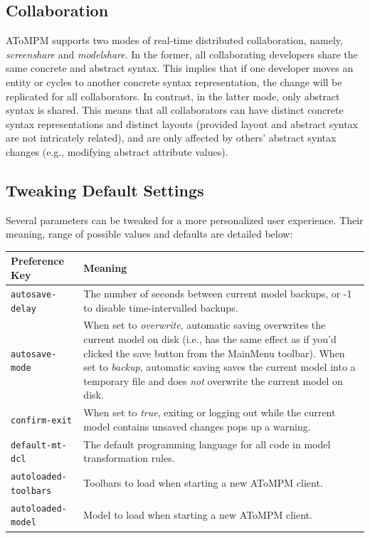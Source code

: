 \documentclass{article}
\numberwithin{equation}{section}
\numberwithin{figure}{section}
\begin{document}
\subsection{Collaboration}
AToMPM supports two modes of real-time distributed collaboration, namely, \textit{screenshare} and \textit{modelshare}. In the former, all collaborating developers share the same concrete and abstract syntax. This implies that if one developer moves an entity or cycles to another concrete syntax representation, the change will be replicated for all collaborators. In contrast, in the latter mode, only abstract syntax is shared. This means that all collaborators can have distinct concrete syntax representations and distinct layouts (provided layout and abstract syntax are not intricately related), and are only affected by others' abstract syntax changes (e.g., modifying abstract attribute values). 



\subsection{Tweaking Default Settings}
\label{ssec:prefs}
Several parameters can be tweaked for a more personalized user experience. Their meaning, range of possible values and defaults are detailed below:\\

\begin{tabular}{| p{4cm}  p{11cm} |}
	\hline
	\textbf{Preference Key} 		& \textbf{Meaning} \\ \hline \hline
	\texttt{autosave-delay}			& The number of seconds between current model backups, or -1 to disable time-intervalled backups. \\
	\texttt{autosave-mode}			& When set to \textit{overwrite}, automatic saving overwrites the current model on disk (i.e., has the same effect as if you'd clicked the save button from the MainMenu toolbar). When set to \textit{backup}, automatic saving saves the current model into a temporary file and does \emph{not} overwrite the current model on disk. \\
	\texttt{confirm-exit}			& When set to \textit{true}, exiting or logging out while the current model contains unsaved changes pops up a warning. \\
	\texttt{default-mt-dcl}			& The default programming language for all code in model transformation rules. \\
	\texttt{autoloaded-toolbars}	& Toolbars to load when starting a new AToMPM client. \\
	\texttt{autoloaded-model}		& Model to load when starting a new AToMPM client. \\
	\hline
\end{tabular}
\vspace*{2em}
\end{document}

